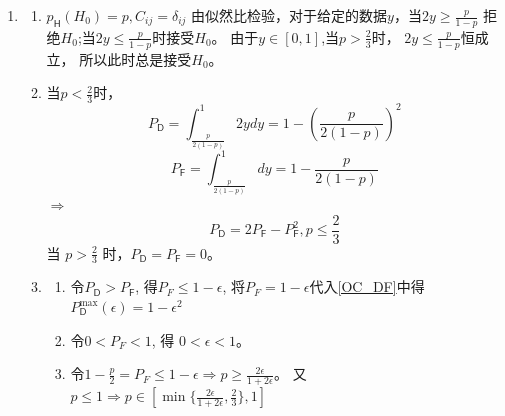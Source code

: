 \documentclass[a4paper]{article}
\begin{document}
\begin{enumerate}[label=\thehwcnt.\arabic*.]
  \setlength{\itemsep}{3\parskip}

  \item 
    \begin{enumerate}[label=(\alph*)]
    \item 
    $p_{\mathsf{H}}(H_0)=p,C_{ij}=\delta_{ij}$
      由似然比检验，对于给定的数据$y$，当$2y\geq \frac{p}{1-p}$ 拒绝$H_0$;当$2y\leq \frac{p}{1-p}$时接受$H_0$。
      由于$y\in [0,1]$,当$p>\frac{2}{3}$时， $2y \leq \frac{p}{1-p}$恒成立，
      所以此时总是接受$H_0$。
    \item
        当$p<\frac{2}{3}$时，
        \[
        P_{\mathsf{D}}=\int_{\frac{p}{2(1-p)}}^1 2y dy=1-\left(\frac{p}{2(1-p)}\right)^2
        \]
        \[P_{\mathsf{F}}=\int_{\frac{p}{2(1-p)}}^{1} dy=1-\frac{p}{2(1-p)}\]        
        $\Rightarrow$ 
        \begin{equation}\label{OC_DF}
            P_{\mathsf{D}} = 2 P_{\mathsf{F}} - P_{\mathsf{F}}^2 ,p\leq \frac{2}{3}            
        \end{equation}
   当 $p>\frac{2}{3}$ 时，$P_{\mathsf{D}} = P_{\mathsf{F}}=0$。
   \item        
    \begin{enumerate}[label=\roman*.]
      \item  令$P_{\mathsf{D}}>P_{\mathsf{F}}$, 得$P_F\leq 1-\epsilon$,
      将$P_F = 1-\epsilon$代入\eqref{OC_DF}中得
      $P^{\textrm{max}}_{\mathsf{D}}(\epsilon)=1-\epsilon^2$
      \item  令$0 < P_F < 1$, 得 $ 0 < \epsilon < 1 $。
      \item  令$1-\frac{p}{2}=P_F \leq 1-\epsilon \Rightarrow p \geq \frac{2\epsilon}{1+2\epsilon}$。
      又 $p \leq 1 \Rightarrow p \in [\min\{\frac{2\epsilon}{1+2\epsilon},\frac{2}{3}\},1]$

    \end{enumerate}
  

\end{enumerate}
\end{enumerate}
\end{document}
